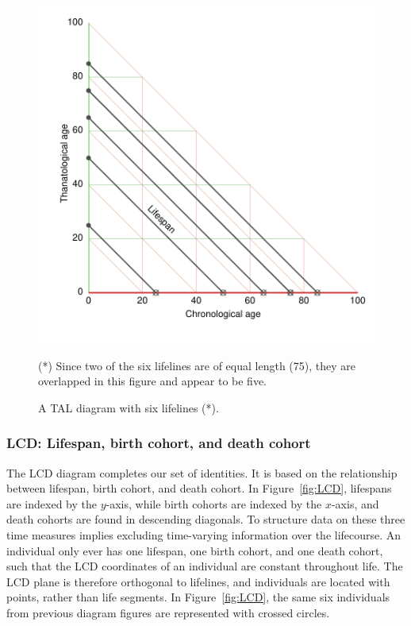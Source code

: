 \documentclass[12pt,oneside,a4paper]{article} %
\theoremstyle{definition}
\newcommand\tgh[1]{\raisebox{-.25\height}{\texttt{[image: Figures/triadtable/triad\#1.pdf]}}}
\begin{document}
\begin{figure}[h!] 
\caption{A TAL diagram with six lifelines (*).}
\label{fig:TAL}
\centering
\includegraphics[scale=0.7]{Figures/TALrt.pdf}

\bigskip
\raggedright
(*) Since two of the six lifelines are of equal length (75), they are
overlapped in this figure and appear to be five.
\end{figure} 


\FloatBarrier
\subsubsection{LCD: Lifespan, birth cohort, and death cohort}%
\label{sec:lcd}
\FloatBarrier

The LCD diagram completes our set of identities. It is based on the relationship
between lifespan, birth cohort, and death cohort. In
Figure~\ref{fig:LCD}, lifespans are indexed by the $y$-axis, while birth cohorts are indexed by the $x$-axis, and death cohorts
are found in descending diagonals. To structure data on these three
time measures implies excluding time-varying information over the lifecourse.
An individual
only ever has one lifespan, one birth cohort, and one death cohort, such that
the LCD coordinates of an individual are constant throughout life.
The LCD plane is therefore orthogonal to lifelines, and individuals are located
with points, rather than life segments.
In Figure~\ref{fig:LCD}, the same six individuals from previous diagram figures are represented with crossed circles.
\end{document}
